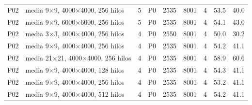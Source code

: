 \begin{tabular}{llrlrrrrr}
P02 & media 9$\times$9, 4000$\times$4000, 256 hilos & 5 & P0 & 2535 & 8001 & 4 & 53.5 & 40.0 \\
P02 & media 9$\times$9, 6000$\times$6000, 256 hilos & 5 & P0 & 2535 & 8001 & 4 & 54.1 & 43.0 \\
P02 & media 3$\times$3, 4000$\times$4000, 256 hilos & 4 & P0 & 2550 & 8001 & 4 & 50.0 & 30.2 \\
P02 & media 9$\times$9, 4000$\times$4000, 256 hilos & 4 & P0 & 2535 & 8001 & 4 & 54.2 & 41.1 \\
P02 & media 21$\times$21, 4000$\times$4000, 256 hilos & 4 & P0 & 2535 & 8001 & 4 & 58.9 & 60.6 \\
P02 & media 9$\times$9, 4000$\times$4000, 128 hilos & 4 & P0 & 2535 & 8001 & 4 & 54.3 & 41.1 \\
P02 & media 9$\times$9, 4000$\times$4000, 256 hilos & 4 & P0 & 2535 & 8001 & 4 & 53.2 & 41.1 \\
P02 & media 9$\times$9, 4000$\times$4000, 512 hilos & 4 & P0 & 2535 & 8001 & 4 & 54.2 & 41.1 \\
\bottomrule
\end{tabular}
